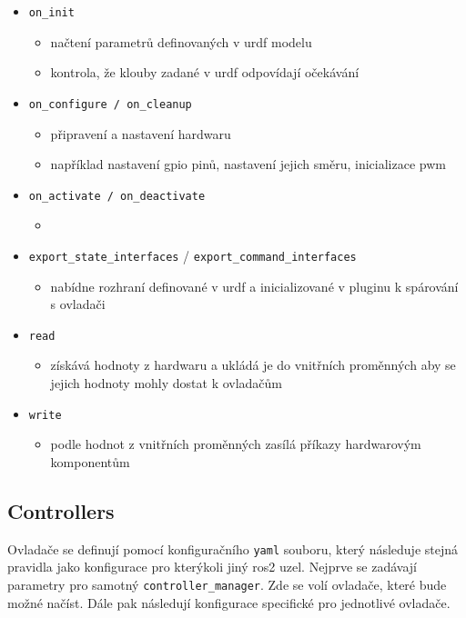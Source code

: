 \begin{itemize}[leftmargin=*]
	\item{\verb|on_init|}
	\vspace*{-0.5em}
	\begin{itemize}
		\item{načtení parametrů definovaných v urdf modelu}
		\item{kontrola, že klouby zadané v urdf odpovídají očekávání}
	\end{itemize}
	\item{\verb|on_configure / on_cleanup|}
	\vspace*{-0.5em}
	\begin{itemize}
		\item{připravení a nastavení hardwaru}
		\item{například nastavení gpio pinů, nastavení jejich směru, inicializace pwm}
	\end{itemize}
	\item{\verb|on_activate / on_deactivate|}
	\vspace*{-0.5em}
	\begin{itemize}
		\item{}
	\end{itemize}
	\item{\verb|export_state_interfaces| / \verb|export_command_interfaces|}
	\vspace*{-0.5em}
	\begin{itemize}
		\item{nabídne rozhraní definované v urdf a inicializované v pluginu k spárování s ovladači}
	\end{itemize}
	\item{\verb|read|}
	\vspace*{-0.5em}
	\begin{itemize}
		\item{získává hodnoty z hardwaru a ukládá je do vnitřních proměnných aby se jejich hodnoty mohly dostat k ovladačům}
	\end{itemize}
	\item{\verb|write|}
	\vspace*{-0.5em}
	\begin{itemize}
		\item{podle hodnot z vnitřních proměnných zasílá příkazy hardwarovým komponentům}
	\end{itemize}
\end{itemize}

\subsection{Controllers}
Ovladače se definují pomocí konfiguračního \verb|yaml| souboru, který následuje stejná pravidla jako konfigurace pro kterýkoli jiný ros2 uzel. Nejprve se zadávají parametry pro samotný \verb|controller_manager|. Zde se volí ovladače, které bude možné načíst. Dále pak následují konfigurace specifické pro jednotlivé ovladače.

